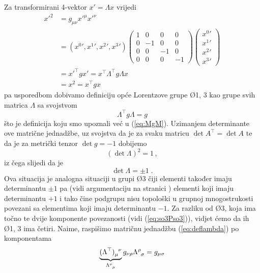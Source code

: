 Za transformirani 4-vektor $x' = \Lambda x$ vrijedi
\begin{align}
 {x'}^2 &= g_{\mu\nu} {x'}^\mu {x'}^\nu \\
        &= ({x^0}', {x^1}', {x^2}', {x^3}')
\begin{pmatrix}
1 & 0 & 0 & 0 \\
0 &-1 & 0 & 0 \\
0 & 0 &-1 & 0 \\
0 & 0 & 0 &-1
\end{pmatrix}
\begin{pmatrix}
{x^0}' \\ {x^1}' \\ {x^2}' \\ {x^3}'
\end{pmatrix} \\
  &= {x'}^{\top} g x' = x^\top \Lambda^\top g \Lambda x \\
  &= x^2 = x^\top g x
\end{align}
pa usporedbom dobivamo definiciju opće Lorentzove grupe
\O{1, 3}
kao grupe svih matrica $\Lambda$ sa svojstvom
\begin{equation}
   \Lambda^\top g \Lambda = g
\label{deflambda}
\end{equation}
što je definicija koju smo upoznali već u (\ref{eq:MgM}).
Uzimanjem determinante ove matrične jednadžbe, uz svojstva
da je za svaku matricu $\det A^\top = \det A$ te da je za
metrički tenzor $\det g = -1$ dobijemo 
\begin{equation}
   (\det \Lambda)^2 = 1 \,,
\end{equation}
iz čega slijedi da je
\begin{equation}
   \det\Lambda = \pm 1 \;.
\label{detL}
\end{equation}
Ova situacija je analogna situaciji u grupi \O{3} čiji elementi
također imaju determinantu $\pm 1$ pa (vidi argumentaciju na
stranici \pageref{eq:povezanostO3}) elementi koji imaju
determinantu $+1$ i tako čine podgrupu  nisu topološki
u grupnoj mnogostrukosti povezani sa elementima koji imaju
determinantu $-1$. Za razliku od \O{3}, koja ima točno te
dvije komponente povezanosti (vidi (\ref{eq:so3Pso3})), 
vidjet ćemo da ih \O{1, 3} ima četiri.
Naime, raspišimo matričnu jednadžbu (\ref{eq:deflambda})  po komponentama
\begin{equation}
    \underbrace{\tensor{(\Lambda^\top)}{_{\mu}^{\nu}}}_{\tensor{\Lambda}{^{\nu}_{\mu}}}
    g_{\nu\rho}\tensor{\Lambda}{^{\rho}_{\sigma}} = g_{\mu\sigma}
\end{equation}
